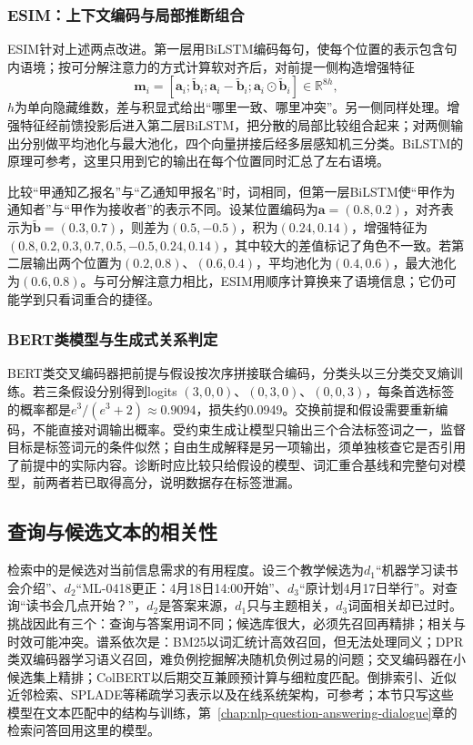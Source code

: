 \subsubsection{ESIM：上下文编码与局部推断组合}
\label{sec:nlp-classification-esim}

ESIM针对上述两点改进。第一层用BiLSTM编码每句，使每个位置的表示包含句内语境；按可分解注意力的方式计算软对齐后，对前提一侧构造增强特征
\[
  \bm m_i=[\bm a_i;\widetilde{\bm b}_i;\bm a_i-\widetilde{\bm b}_i;\bm a_i\odot\widetilde{\bm b}_i]\in\mathbb R^{8h},
\]
$h$为单向隐藏维数，差与积显式给出“哪里一致、哪里冲突”。另一侧同样处理。增强特征经前馈投影后进入第二层BiLSTM，把分散的局部比较组合起来；对两侧输出分别做平均池化与最大池化，四个向量拼接后经多层感知机三分类。BiLSTM的原理可参考，这里只用到它的输出在每个位置同时汇总了左右语境。

比较“甲通知乙报名”与“乙通知甲报名”时，词相同，但第一层BiLSTM使“甲作为通知者”与“甲作为接收者”的表示不同。设某位置编码为$\bm a=(0.8,0.2)$，对齐表示为$\widetilde{\bm b}=(0.3,0.7)$，则差为$(0.5,-0.5)$，积为$(0.24,0.14)$，增强特征为$(0.8,0.2,0.3,0.7,0.5,-0.5,0.24,0.14)$，其中较大的差值标记了角色不一致。若第二层输出两个位置为$(0.2,0.8)$、$(0.6,0.4)$，平均池化为$(0.4,0.6)$，最大池化为$(0.6,0.8)$。与可分解注意力相比，ESIM用顺序计算换来了语境信息；它仍可能学到只看词重合的捷径。

\subsubsection{BERT类模型与生成式关系判定}
\label{sec:nlp-classification-nli-bert}

BERT类交叉编码器把前提与假设按次序拼接联合编码，分类头以三分类交叉熵训练。若三条假设分别得到logits $(3,0,0)$、$(0,3,0)$、$(0,0,3)$，每条首选标签的概率都是$e^3/(e^3+2)\approx0.9094$，损失约0.0949。交换前提和假设需要重新编码，不能直接对调输出概率。受约束生成让模型只输出三个合法标签词之一，监督目标是标签词元的条件似然；自由生成解释是另一项输出，须单独核查它是否引用了前提中的实际内容。诊断时应比较只给假设的模型、词汇重合基线和完整句对模型，前两者若已取得高分，说明数据存在标签泄漏。

\subsection{查询与候选文本的相关性}
\label{sec:nlp-classification-relevance}

检索中的是候选对当前信息需求的有用程度。设三个教学候选为$d_1$“机器学习读书会介绍”、$d_2$“ML-0418更正：4月18日14:00开始”、$d_3$“原计划4月17日举行”。对查询“读书会几点开始？”，$d_2$是答案来源，$d_1$只与主题相关，$d_3$词面相关却已过时。挑战因此有三个：查询与答案用词不同；候选库很大，必须先召回再精排；相关与时效可能冲突。谱系依次是：BM25以词汇统计高效召回，但无法处理同义；DPR类双编码器学习语义召回，难负例挖掘解决随机负例过易的问题；交叉编码器在小候选集上精排；ColBERT以后期交互兼顾预计算与细粒度匹配。倒排索引、近似近邻检索、SPLADE等稀疏学习表示以及在线系统架构，可参考；本节只写这些模型在文本匹配中的结构与训练，第~\ref{chap:nlp-question-answering-dialogue}章的检索问答回用这里的模型。

